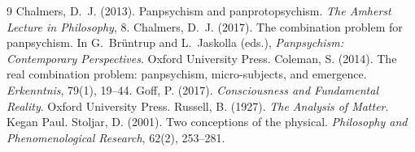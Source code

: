 \documentclass{situationist-preprint}
\begin{document}
\begin{thebibliography}{9}\small
{} Chalmers, D.~J. (2013). Panpsychism and panprotopsychism. \emph{The Amherst Lecture in Philosophy}, 8.
 Chalmers, D.~J. (2017). The combination problem for panpsychism. In G.~Br\"untrup and L.~Jaskolla (eds.), \emph{Panpsychism: Contemporary Perspectives}. Oxford University Press.
 Coleman, S. (2014). The real combination problem: panpsychism, micro-subjects, and emergence. \emph{Erkenntnis}, 79(1), 19--44.
 Goff, P. (2017). \emph{Consciousness and Fundamental Reality}. Oxford University Press.
 Russell, B. (1927). \emph{The Analysis of Matter}. Kegan Paul.
 Stoljar, D. (2001). Two conceptions of the physical. \emph{Philosophy and Phenomenological Research}, 62(2), 253--281.
\end{thebibliography}
\end{document}
